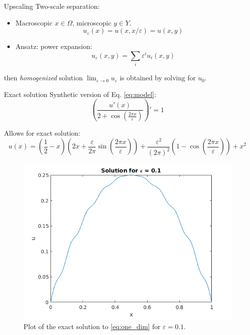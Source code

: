 \documentclass{beamer}
\renewcommand{\epsilon}{\varepsilon}
\begin{document}
\begin{frame}[t]{Upscaling}
    Two-scale separation: \begin{itemize}
        \item Macroscopic $x \in \Omega$, microscopic $y \in Y$.
        \[u_\varepsilon(x) = u(x,x/\varepsilon) = u(x,y)\]
        \item Ansatz: power expansion:
        \begin{equation*}
            u_\varepsilon(x,y) = \sum_i \varepsilon^i u_i(x,y)
            \label{eq:pow_exp}
        \end{equation*}
    \end{itemize}
    then \emph{homogenized} solution $\lim_{\varepsilon\to 0} u_\varepsilon$ is obtained by solving for $u_0$.
\end{frame}


\begin{frame}[t]{Exact solution}
  Synthetic version of Eq. \eqref{eq:model}:
  \begin{equation}
    \left( \frac{u'(x)}{2+\cos \left( \frac{2\pi x}{\epsilon} \right)} \right)' = 1
    \label{eq:one_dim}
  \end{equation}

  Allows for exact solution:
  \begin{equation}
    u(x) = \left( \frac{1}{2} - x \right) \left(2x + \frac{\epsilon}{2\pi}\sin\left(\frac{2\pi x}{\epsilon}\right) \right) + \frac{\epsilon^{2}}{(2\pi)^{2}}\left( 1 - \cos \left( \frac{2 \pi x}{\epsilon} \right) \right) + x^{2}
   \label{eq:one_dim_sol}
 \end{equation}
 \begin{figure}[th]
    \centering
    \includegraphics[width=0.35\linewidth]{one_dim_exact.png}
    \caption{Plot of the exact solution to \eqref{eq:one_dim} for $\epsilon=0.1 $.}
    \label{fig:one_dim_exact}
\end{figure}
\end{frame}
\end{document}
